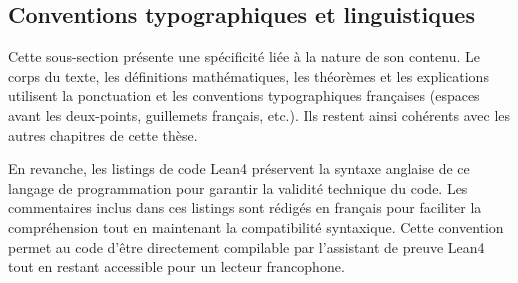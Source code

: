 \subsection{Conventions typographiques et linguistiques}
\label{subsec:conventions_typographiques}
\begin{sloppypar}
Cette sous-section pr\'esente une sp\'ecificit\'e li\'ee \`a la nature de son
contenu. Le corps du texte, les d\'efinitions math\'ematiques, les
th\'eor\`emes et les explications utilisent la ponctuation et les conventions
typographiques fran\c{c}aises (espaces avant les deux-points, guillemets
fran\c{c}ais, etc.). Ils restent ainsi coh\'erents avec les autres chapitres de cette th\`ese.

En revanche, les listings de code Lean4 pr\'eservent la syntaxe anglaise de
ce langage de programmation pour garantir la validit\'e technique du code.
Les commentaires inclus dans ces listings sont r\'edig\'es en fran\c{c}ais pour
faciliter la compr\'ehension tout en maintenant la compatibilit\'e syntaxique.
Cette convention permet au code d'\^etre directement compilable par
l'assistant de preuve Lean4 tout en restant accessible pour un lecteur
francophone.
\end{sloppypar}

